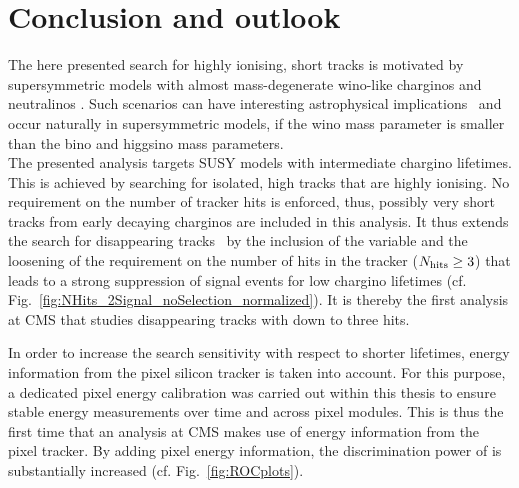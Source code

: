
\FloatBarrier
\chapter{Conclusion and outlook}
\label{sec:Discussion}

The here presented search for highly ionising, short tracks is motivated by supersymmetric models with almost mass-degenerate wino-like charginos \chipm and neutralinos \chiO.
Such scenarios can have interesting astrophysical implications~\cite{bib:Moroi:DarkMatter_2013} and occur naturally in supersymmetric models, if the wino mass parameter is smaller than the bino and higgsino mass parameters.\\

The presented analysis targets SUSY models with intermediate chargino lifetimes. 
This is achieved by searching for isolated, high \pt tracks that are highly ionising.
No requirement on the number of tracker hits is enforced, thus, possibly very short tracks from early decaying charginos are included in this analysis.
It thus extends the search for disappearing tracks~\cite{bib:CMS:DT_8TeV} by the inclusion of the variable \dedx and the loosening of the requirement on the number of hits in the tracker ($N_{\text{hits}}\geq3$) that leads to a strong suppression of signal events for low chargino lifetimes (cf. Fig.~\ref{fig:NHits_2Signal_noSelection_normalized}).
It is thereby the first analysis at CMS that studies disappearing tracks with down to three hits.

In order to increase the search sensitivity with respect to shorter lifetimes, energy information from the pixel silicon tracker is taken into account.
For this purpose, a dedicated pixel energy calibration was carried out within this thesis to ensure stable energy measurements over time and across pixel modules.
This is thus the first time that an analysis at CMS makes use of energy information from the pixel tracker.
By adding pixel energy information, the discrimination power of \dedx is substantially increased (cf. Fig.~\ref{fig:ROCplots}).\\

